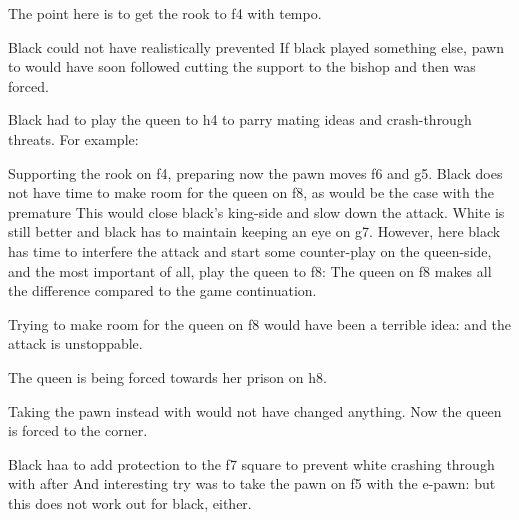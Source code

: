 The point here is to get the rook to f4 with tempo.

Black could not have realistically prevented  If black
played something else, pawn to  would have soon followed
cutting the support to the bishop and then  was forced.

Black had to play the queen to h4 to parry mating ideas and
crash-through threats. For example:

Supporting the rook on f4, preparing now the pawn moves f6 and
g5. Black does not have time to make room for the queen on f8, as
would be the case with the premature  This would
close black's king-side and slow down the attack. White is still
better and black has to maintain keeping an eye on g7. However, here
black has time to interfere the attack and start some counter-play on
the queen-side, and the most important of all, play the queen to
f8:  The queen on f8 makes all the
difference compared to the game continuation.

Trying to make room for the queen on f8 would have been a terrible
idea: 
and the attack is unstoppable.

The queen is being forced towards her prison on h8.


Taking the pawn instead with  would not have
changed anything. Now the queen is forced to the corner.


Black haa to add protection to the f7 square to prevent white crashing
through with  after  And interesting try was
to take the pawn on f5 with the e-pawn:  but this does not work out for black, either.




